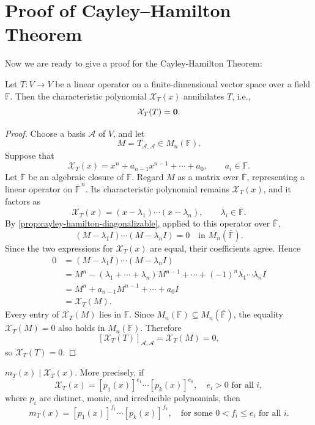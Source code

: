 \section{Proof of Cayley–Hamilton Theorem}
Now we are ready to give a proof for the Cayley-Hamilton Theorem:
\begin{theorem}\label{thm:cayley-hamilton-weaker}
Let \( T : V \to V \) be a linear operator on a finite-dimensional vector space over a field \( \mathbb{F} \). Then the characteristic polynomial \( \mathcal{X}_T(x) \) annihilates \( T \), i.e.,
\[
\mathcal{X}_T(T) = {\bf 0}.
\]
\end{theorem}

\begin{proof}
Choose a basis \(\mathcal A\) of \(V\), and let
\[
M=T_{\mathcal A,\mathcal A}\in M_n(\mathbb F).
\]
Suppose that
\[
\mathcal X_T(x)=x^n+a_{n-1}x^{n-1}+\cdots+a_0,
\qquad a_i\in\mathbb F.
\]
Let \(\overline{\mathbb F}\) be an algebraic closure of \(\mathbb F\).
Regard \(M\) as a matrix over \(\overline{\mathbb F}\), representing a linear operator on \(\overline{\mathbb F}^{\,n}\).
Its characteristic polynomial remains \(\mathcal X_T(x)\), and it factors as
\[
\mathcal X_T(x)=(x-\lambda_1)\cdots(x-\lambda_n),
\qquad \lambda_i\in\overline{\mathbb F}.
\]
By \autoref{prop:cayley-hamilton-diagonalizable}, applied to this operator over \(\overline{\mathbb F}\),
\[
(M-\lambda_1I)\cdots(M-\lambda_nI)=0
\quad\text{in }M_n(\overline{\mathbb F}).
\]
Since the two expressions for \(\mathcal X_T(x)\) are equal, their coefficients agree. Hence
\begin{align*}
0&=(M-\lambda_1I)\cdots(M-\lambda_nI)\\
&=M^n-(\lambda_1+\cdots+\lambda_n)M^{n-1}
 +\cdots+(-1)^n\lambda_1\cdots\lambda_nI\\
&=M^n+a_{n-1}M^{n-1}+\cdots+a_0I\\
&=\mathcal X_T(M).
\end{align*}
Every entry of \(\mathcal X_T(M)\) lies in \(\mathbb F\). Since
\(M_n(\mathbb F)\subseteq M_n(\overline{\mathbb F})\), the equality
\(\mathcal X_T(M)=0\) also holds in \(M_n(\mathbb F)\). Therefore
\[
[\mathcal X_T(T)]_{\mathcal A,\mathcal A}=\mathcal X_T(M)=0,
\]
so \(\mathcal X_T(T)=0\).
\end{proof}

\begin{corollary}\label{cor:cayley-hamiton-cor}
$m_T(x) \mid \mathcal{X}_T(x)$. More precisely, if
\[
\mathcal{X}_T(x) = [p_1(x)]^{e_1} \cdots [p_k(x)]^{e_k}, \quad e_i > 0 \text{ for all } i,
\]
where $p_i$ are distinct, monic, and irreducible polynomials, then
\[
m_T(x) = [p_1(x)]^{f_1} \cdots [p_k(x)]^{f_k}, \quad \text{for some } 0 < f_i \leq e_i \text{ for all } i.
\]
\end{corollary}


